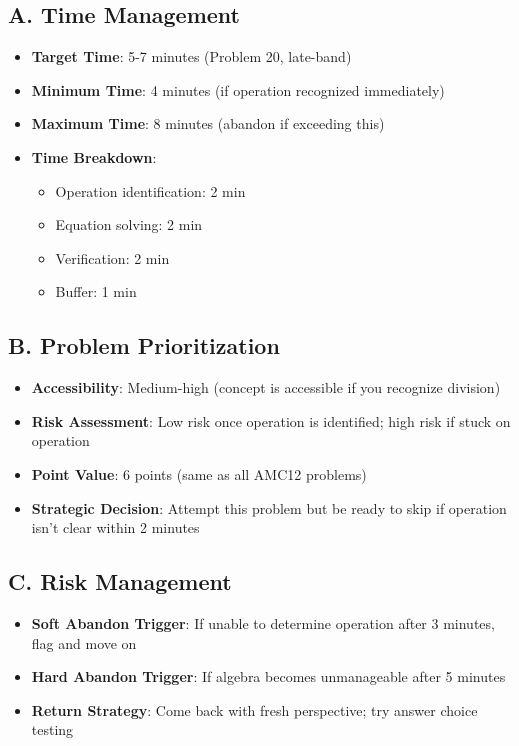 \documentclass[11pt]{article}
\begin{document}
\begin{competitionbox}
\subsection*{A. Time Management}
\begin{itemize}[leftmargin=*]
    \item \textbf{Target Time}: 5-7 minutes (Problem 20, late-band)
    \item \textbf{Minimum Time}: 4 minutes (if operation recognized immediately)
    \item \textbf{Maximum Time}: 8 minutes (abandon if exceeding this)
    \item \textbf{Time Breakdown}:
    \begin{itemize}
        \item Operation identification: 2 min
        \item Equation solving: 2 min
        \item Verification: 2 min
        \item Buffer: 1 min
    \end{itemize}
\end{itemize}

\subsection*{B. Problem Prioritization}
\begin{itemize}[leftmargin=*]
    \item \textbf{Accessibility}: Medium-high (concept is accessible if you recognize division)
    \item \textbf{Risk Assessment}: Low risk once operation is identified; high risk if stuck on operation
    \item \textbf{Point Value}: 6 points (same as all AMC12 problems)
    \item \textbf{Strategic Decision}: Attempt this problem but be ready to skip if operation isn't clear within 2 minutes
\end{itemize}

\subsection*{C. Risk Management}
\begin{itemize}[leftmargin=*]
    \item \textbf{Soft Abandon Trigger}: If unable to determine operation after 3 minutes, flag and move on
    \item \textbf{Hard Abandon Trigger}: If algebra becomes unmanageable after 5 minutes
    \item \textbf{Return Strategy}: Come back with fresh perspective; try answer choice testing
\end{itemize}


\end{competitionbox}
\end{document}
